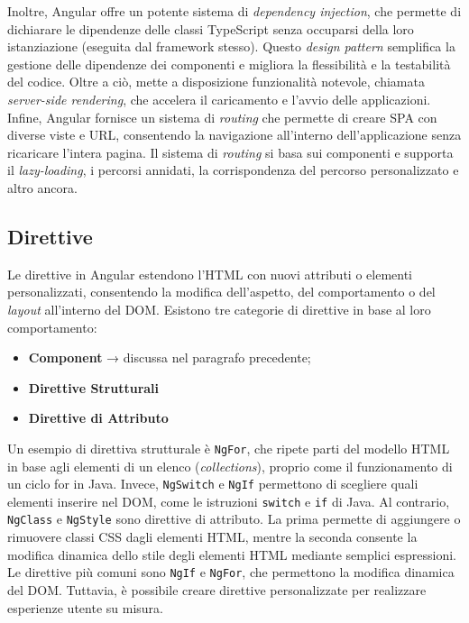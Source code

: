 Inoltre, Angular offre un potente sistema di \textit{dependency injection}, che permette di dichiarare le dipendenze delle classi TypeScript senza occuparsi della loro istanziazione (eseguita dal framework stesso). Questo \textit{design pattern} semplifica la gestione delle dipendenze dei componenti e migliora la flessibilità e la testabilità del codice.\cite{ANGULAR_angular} Oltre a ciò, mette a disposizione funzionalità notevole, chiamata \textit{server-side rendering}, che accelera il caricamento e l’avvio delle applicazioni.\cite{ANGULAR_mrw}
Infine, Angular fornisce un sistema di \textit{routing} che permette di creare SPA con diverse viste e URL, consentendo la navigazione all’interno dell’applicazione senza ricaricare l'intera pagina. Il sistema di \textit{routing} si basa sui componenti e supporta il \textit{lazy-loading}, i percorsi annidati, la corrispondenza del percorso personalizzato e altro ancora.\cite{ANGULAR_angular}

\subsection{Direttive}
Le direttive in Angular estendono l’HTML con nuovi attributi o elementi personalizzati, consentendo la modifica dell’aspetto, del comportamento o del \textit{layout} all’interno del DOM. Esistono tre categorie di direttive in base al loro comportamento:
\begin{itemize}
    \item \textbf{Component} → discussa nel paragrafo precedente;
    \item \textbf{Direttive Strutturali}
    \item \textbf{Direttive di Attributo}
\end{itemize}

Un esempio di direttiva strutturale è \texttt{NgFor}, che ripete parti del modello HTML in base agli elementi di un elenco (\textit{collections}), proprio come il funzionamento di un ciclo for in Java. Invece, \texttt{NgSwitch} e \texttt{NgIf} permettono di scegliere quali elementi inserire nel DOM, come le istruzioni \texttt{switch} e \texttt{if} di Java.
Al contrario, \texttt{NgClass} e \texttt{NgStyle} sono direttive di attributo. La prima permette di aggiungere o rimuovere classi CSS dagli elementi HTML, mentre la seconda consente la modifica dinamica dello stile degli elementi HTML mediante semplici espressioni.
Le direttive più comuni sono \texttt{NgIf} e \texttt{NgFor}, che permettono la modifica dinamica del DOM.\cite{ANGULAR_angular3} Tuttavia, è possibile creare direttive personalizzate per realizzare esperienze utente su misura.

